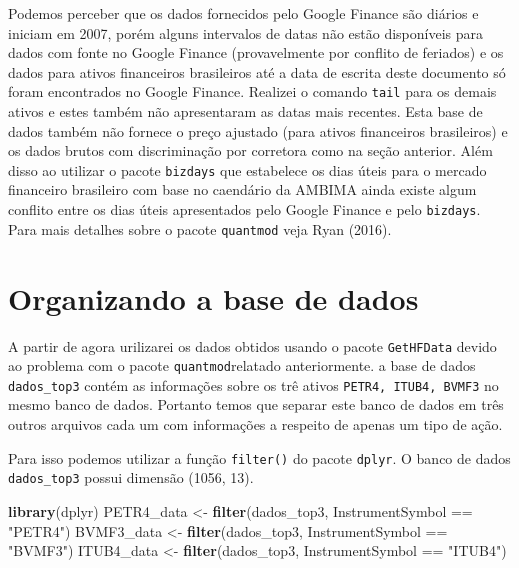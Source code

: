 \documentclass[]{article}
\newenvironment{Shaded}{\begin{snugshade}}{\end{snugshade}}
\newcommand{\KeywordTok}[1]{\textcolor[rgb]{0.13,0.29,0.53}{\textbf{{#1}}}}
\newcommand{\StringTok}[1]{\textcolor[rgb]{0.31,0.60,0.02}{{#1}}}
\newcommand{\NormalTok}[1]{{#1}}
\begin{document}
Podemos perceber que os dados fornecidos pelo Google Finance são diários
e iniciam em 2007, porém alguns intervalos de datas não estão
disponíveis para dados com fonte no Google Finance (provavelmente por
conflito de feriados) e os dados para ativos financeiros brasileiros até
a data de escrita deste documento só foram encontrados no Google
Finance. Realizei o comando \texttt{tail} para os demais ativos e estes
também não apresentaram as datas mais recentes. Esta base de dados
também não fornece o preço ajustado (para ativos financeiros
brasileiros) e os dados brutos com discriminação por corretora como na
seção anterior. Além disso ao utilizar o pacote \texttt{bizdays} que
estabelece os dias úteis para o mercado financeiro brasileiro com base
no caendário da AMBIMA ainda existe algum conflito entre os dias úteis
apresentados pelo Google Finance e pelo \texttt{bizdays}. Para mais
detalhes sobre o pacote \texttt{quantmod} veja Ryan (2016).

\section{Organizando a base de dados}\label{organizando-a-base-de-dados}

A partir de agora urilizarei os dados obtidos usando o pacote
\texttt{GetHFData} devido ao problema com o pacote
\texttt{quantmod}relatado anteriormente. a base de dados
\texttt{dados\_top3} contém as informações sobre os trê ativos
\texttt{PETR4,\ ITUB4,\ BVMF3} no mesmo banco de dados. Portanto temos
que separar este banco de dados em três outros arquivos cada um com
informações a respeito de apenas um tipo de ação.

Para isso podemos utilizar a função \texttt{filter()} do pacote
\texttt{dplyr}. O banco de dados \texttt{dados\_top3} possui dimensão
(1056, 13).

\begin{Shaded}
\begin{Highlighting}[]
\KeywordTok{library}\NormalTok{(dplyr)}
\NormalTok{PETR4_data <-}\StringTok{ }\KeywordTok{filter}\NormalTok{(dados_top3, InstrumentSymbol ==}\StringTok{ "PETR4"}\NormalTok{)}
\NormalTok{BVMF3_data <-}\StringTok{ }\KeywordTok{filter}\NormalTok{(dados_top3, InstrumentSymbol ==}\StringTok{ "BVMF3"}\NormalTok{)}
\NormalTok{ITUB4_data <-}\StringTok{ }\KeywordTok{filter}\NormalTok{(dados_top3, InstrumentSymbol ==}\StringTok{ "ITUB4"}\NormalTok{)}
\end{Highlighting}
\end{Shaded}
\end{document}

